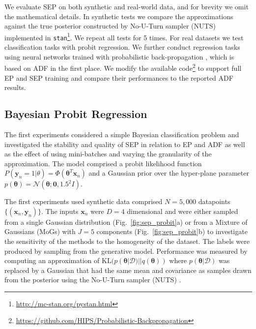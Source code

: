 We evaluate SEP on both synthetic and real-world data, and for brevity we omit the mathematical details. In synthetic tests we compare the approximations against the true posterior constructed by No-U-Turn sampler (NUTS) \cite{hoffman:nuts} implemented in \texttt{stan}\footnote{\url{http://mc-stan.org/pystan.html}}. We repeat all tests for 5 times.
%
For real datasets we test classification tasks with probit regression. We further conduct regression tasks using neural networks trained with probabilistic back-propagation \cite{miguel:pbp}, which is based on ADF in the first place. We modify the available code\footnote{\url{https://github.com/HIPS/Probabilistic-Backpropagation}} to support full EP and SEP training and compare their performances to the reported ADF results.


\subsection{Bayesian Probit Regression}
%
The first experiments considered a simple Bayesian classification problem and investigated the stability and quality of SEP in relation to EP and ADF as well as the effect of using mini-batches and varying the granularity of the approximation. The model comprised a probit likelihood function $P(\bm{y}_n = 1|\theta) = \Phi(\bm{\theta}^T \bm{x}_n)$ and a Gaussian prior over the hyper-plane parameter  $p(\bm{\theta}) = \mathcal{N}(\bm{\theta}; \bm{0}, 1.5^2 I)$.  

The first experiments used synthetic data comprised $N=5,000$ datapoints $\{ (\bm{x}_n, \bm{y}_n) \}$. The inputs $\bm{x}_n$ were $D=4$ dimensional and were either sampled from a single Gaussian distribution (Fig.~\ref{fig:sep_probit}a) or from a Mixture of Gaussians (MoGs) with $J=5$ components (Fig.~\ref{fig:sep_probit}b) to investigate the sensitivity of the methods to the homogeneity of the dataset. The labels were produced by sampling from the generative model. Performance was measured by computing an approximation of $\mathrm{KL}(p(\bm{\theta}|\mathcal{D}) || q(\bm{\theta}))$ where $p(\bm{\theta}|\mathcal{D})$ was replaced by a Gaussian that had the same mean and covariance as samples drawn from the posterior using the No-U-Turn sampler (NUTS) \cite{hoffman:nuts}.


